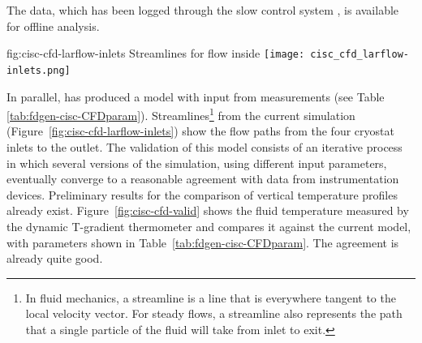 
The data, which has been logged through the  slow control system \cite{pdspdcs_proc}, is available for offline analysis. %

\begin{dunefigure}{fig:cisc-cfd-larflow-inlets}
  {Streamlines for \lar flow inside  }
  \texttt{[image: cisc\_cfd\_larflow-inlets.png]}
\end{dunefigure}

In parallel,  has produced a   model %
with input from  measurements (see Table  \ref{tab:fdgen-cisc-CFDparam}). Streamlines\footnote{In fluid mechanics, a streamline is a line that is everywhere tangent to the local velocity vector. For steady flows, a streamline also represents the path that a single particle of the fluid will take from inlet to exit.} from the current  simulation (Figure~\ref{fig:cisc-cfd-larflow-inlets}) show the flow paths from the four cryostat inlets to the outlet. The validation of this model consists of an iterative process in which several versions of the  simulation, using different input parameters, eventually %
converge %
to a reasonable agreement with data from instrumentation devices. Preliminary results for the comparison of vertical temperature profiles already exist. Figure~\ref{fig:cisc-cfd-valid} shows the fluid temperature measured by the dynamic T-gradient thermometer and compares it against the current   model, with parameters shown in Table~\ref{tab:fdgen-cisc-CFDparam}.
The agreement is already quite good. %


